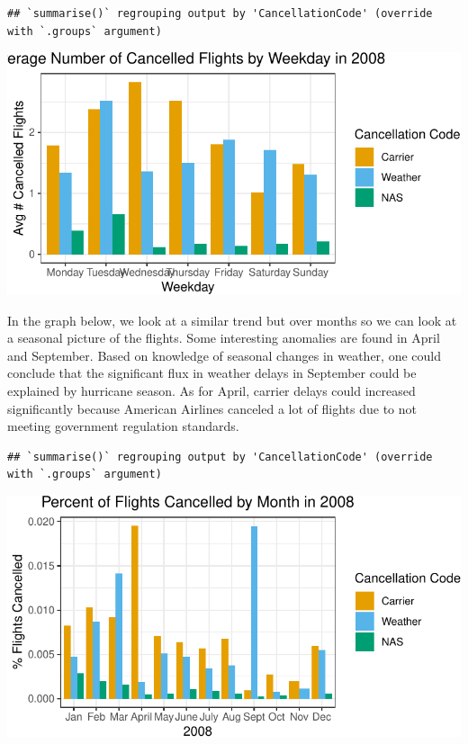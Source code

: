 \documentclass[
]{article}
\begin{document}
\begin{verbatim}
## `summarise()` regrouping output by 'CancellationCode' (override with `.groups` argument)
\end{verbatim}

\begin{center}\includegraphics{STA380Exercises_Ofunrein_Pflum_Robinson_Vincent_files/figure-latex/unnamed-chunk-10-1} \end{center}

In the graph below, we look at a similar trend but over months so we can
look at a seasonal picture of the flights. Some interesting anomalies
are found in April and September. Based on knowledge of seasonal changes
in weather, one could conclude that the significant flux in weather
delays in September could be explained by hurricane season. As for
April, carrier delays could increased significantly because American
Airlines canceled a lot of flights due to not meeting government
regulation standards.

\begin{verbatim}
## `summarise()` regrouping output by 'CancellationCode' (override with `.groups` argument)
\end{verbatim}

\begin{center}\includegraphics{STA380Exercises_Ofunrein_Pflum_Robinson_Vincent_files/figure-latex/unnamed-chunk-11-1} \end{center}
\end{document}

